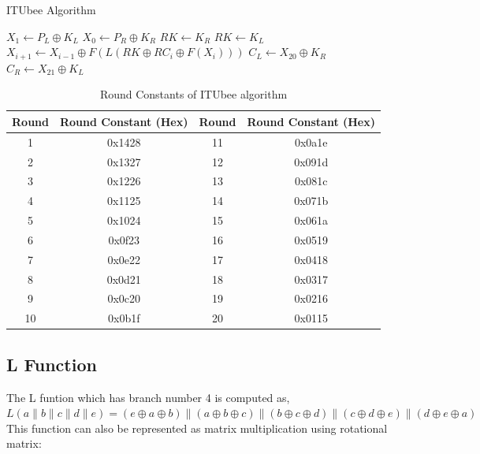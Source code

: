 \begin{section}{ITUbee Algorithm}
\begin{algorithm}
    \caption{Pseudo code for ITUbee encryption}
    \label{alg:ITUbee}
    \begin{algorithmic}[1]
        \STATE $X_1 \gets P_L \oplus K_L$
        \STATE $X_0 \gets P_R \oplus K_R$
                \STATE $RK \gets K_R$
            \ELSE
                \STATE $RK \gets K_L$
            \ENDIF
            \STATE $X_{i+1} \gets X_{i-1} \oplus F(L(RK \oplus RC_i \oplus F(X_i)))$
            \STATE {}
        \ENDFOR
        \STATE $C_L \gets X_{20} \oplus K_R$
        \STATE $C_R \gets X_{21} \oplus K_L$
    \end{algorithmic}
\end{algorithm}

\begin{table}[H]
    \centering
    \begin{tabular}{|c|c|c|c|}
        \hline
        \textbf{Round} & \textbf{Round Constant (Hex)} & \textbf{Round} & \textbf{Round Constant (Hex)} \\
        \hline
        1  & 0x1428 & 11 & 0x0a1e \\
        2  & 0x1327 & 12 & 0x091d \\
        3  & 0x1226 & 13 & 0x081c \\
        4  & 0x1125 & 14 & 0x071b \\
        5  & 0x1024 & 15 & 0x061a \\
        6  & 0x0f23 & 16 & 0x0519 \\
        7  & 0x0e22 & 17 & 0x0418 \\
        8  & 0x0d21 & 18 & 0x0317 \\
        9  & 0x0c20 & 19 & 0x0216 \\
        10 & 0x0b1f & 20 & 0x0115 \\
        \hline
    \end{tabular}
    \caption{Round Constants of ITUbee algorithm}
    \label{tab:ITUbee_rc}
\end{table}

\subsection{L Function}
The L funtion which has branch number 4 is computed as,\\
$L(a \parallel b \parallel c \parallel d \parallel e) = (e \oplus a \oplus b) \parallel (a \oplus b \oplus c) \parallel (b \oplus c \oplus d) \parallel (c \oplus d \oplus e) \parallel (d \oplus e \oplus a)$
\\This function can also be represented as matrix multiplication using rotational matrix:


\end{section}
